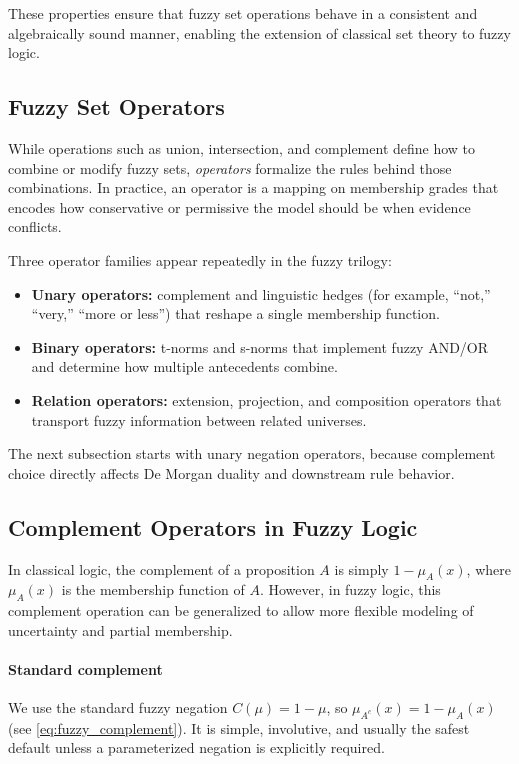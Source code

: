 These properties ensure that fuzzy set operations behave in a consistent and algebraically sound manner, enabling the extension of classical set theory to fuzzy logic.

\subsection{Fuzzy Set Operators}
\label{sec:fuzzysets_fuzzy_set_operators}

While operations such as union, intersection, and complement define how to combine or modify fuzzy sets, \emph{operators} formalize the rules behind those combinations. In practice, an operator is a mapping on membership grades that encodes how conservative or permissive the model should be when evidence conflicts.

Three operator families appear repeatedly in the fuzzy trilogy:
\begin{itemize}
    \item \textbf{Unary operators:} complement and linguistic hedges (for example, ``not,'' ``very,'' ``more or less'') that reshape a single membership function.
    \item \textbf{Binary operators:} t\hyp{}norms and s\hyp{}norms that implement fuzzy AND/OR and determine how multiple antecedents combine.
    \item \textbf{Relation operators:} extension, projection, and composition operators that transport fuzzy information between related universes.
\end{itemize}

The next subsection starts with unary negation operators, because complement choice directly affects De Morgan duality and downstream rule behavior.

\subsection{Complement Operators in Fuzzy Logic}
\label{sec:fuzzysets_complement_operators_in_fuzzy_logic}

In classical logic, the complement of a proposition \( A \) is simply \( 1 - \mu_A(x) \), where \(\mu_A(x)\) is the membership function of \( A \). However, in fuzzy logic, this complement operation can be generalized to allow more flexible modeling of uncertainty and partial membership.

\paragraph{Standard complement}
We use the standard fuzzy negation \(C(\mu)=1-\mu\), so \(\mu_{A^c}(x)=1-\mu_A(x)\) (see \eqref{eq:fuzzy_complement}). It is simple, involutive, and usually the safest default unless a parameterized negation is explicitly required.

